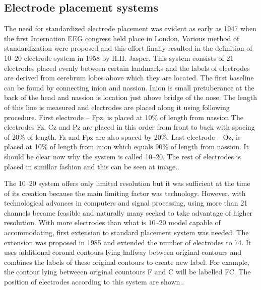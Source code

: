 \subsection{Electrode placement systems}
The need for standardized electrode placement was evident as early as 1947 when
the first Internation EEG congress held place in London. Various method of
standardization were proposed and this effort finally resulted in the definition
of 10--20 electrode system in 1958 by H.H. Jasper. \cite{placeSys} 
This system consists of 21 electrodes placed evenly between certain landmarks
and the labels of electrodes are derived from cerebrum lobes above which they
are located. The first baseline can be found by connecting inion and nassion.
Inion is small pretuberance at the back of the head and nassion is location just
above bridge of the nose. The length of this line is measured and electrodes are
placed along it using following procedure. First electrode -- Fpz, is placed at
10\% of length from nassion The electrodes Fz, Cz and Pz are placed in this
order from front to back with spacing of 20\% of length. Fz and Fpz are also
spaced by 20\%. Last electrode -- Oz, is placed at 10\% of length from inion
which equals 90\% of length from nassion. It should be clear now why the system
is called 10--20. The rest of electrodes is placed in simillar fashion and this
can be seen at image.. %

The 10--20 system offers only limited resolution but it was sufficient at the
time of its creation because the main limiting factor was technology. However,
with technological advances in computers and signal processing, using more than
21 channels became feasible and naturally many seeked to take advantage of
higher resolution. With more electrodes than what is 10--20 model capable of
accommodating, first extension to standard placement system was needed. The
extension was proposed in 1985 and extended the number of electrodes to 74. It
uses additional coronal contours lying halfway between original contours and
combines the labels of these original contours to create new label.
For example, the contour lying betweeen original countours F and C will be
labelled FC. \cite{placeSys} The position of electrodes according to this system
are shown.. %

